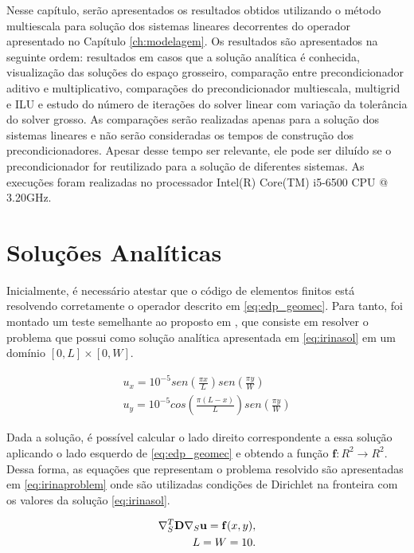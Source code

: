 Nesse capítulo, serão apresentados os resultados obtidos utilizando o método multiescala para solução dos sistemas lineares decorrentes do operador apresentado no Capítulo \ref{ch:modelagem}. Os resultados são apresentados na seguinte ordem: resultados em casos que a solução analítica é conhecida, visualização das soluções do espaço grosseiro, comparação entre precondicionador aditivo e multiplicativo, comparações do precondicionador multiescala, multigrid e ILU e estudo do número de iterações do solver linear com variação da tolerância do solver grosso. As comparações serão realizadas apenas para a solução dos sistemas lineares e não serão consideradas os tempos de construção dos precondicionadores. Apesar desse tempo ser relevante, ele pode ser diluído se o precondicionador for reutilizado para a solução de diferentes sistemas. As execuções foram realizadas no processador Intel(R) Core(TM) i5-6500 CPU @ 3.20GHz.

\section{Soluções Analíticas}

Inicialmente, é necessário atestar que o código de elementos finitos está resolvendo corretamente o operador descrito em \eqref{eq:edp_geomec}. Para tanto, foi montado um teste semelhante ao proposto em \cite{irina}, que consiste em resolver o problema que possui como solução analítica apresentada em \eqref{eq:irinasol} em um domínio  $[0, L] \times [0, W]$.


\begin{equation} \label{eq:irinasol}
  \begin{aligned}
  u_x = 10^{-5} sen(\frac{\pi x}{L}) sen(\frac{\pi y}{W})  \\
  u_y = 10^{-5} cos(\frac{\pi (L-x)}{L}) sen(\frac{\pi y}{W})
  \end{aligned}
\end{equation}

Dada a solução, é possível calcular o lado direito correspondente a essa solução aplicando o lado esquerdo de \eqref{eq:edp_geomec} e obtendo a função $\mathbf{f}: R^2 \rightarrow R^2$. Dessa forma, as equações que representam o problema resolvido são apresentadas em \eqref{eq:irinaproblem} onde são utilizadas condições de Dirichlet na fronteira com os valores da solução \eqref{eq:irinasol}. 

\begin{equation}\label{eq:irinaproblem}
    \begin{aligned}
        \nabla_S^T \mathbf{D} \nabla_S  \mathbf{u} = \mathbf{f}(x, y), \\
        L = W = 10.
    \end{aligned}
\end{equation}

